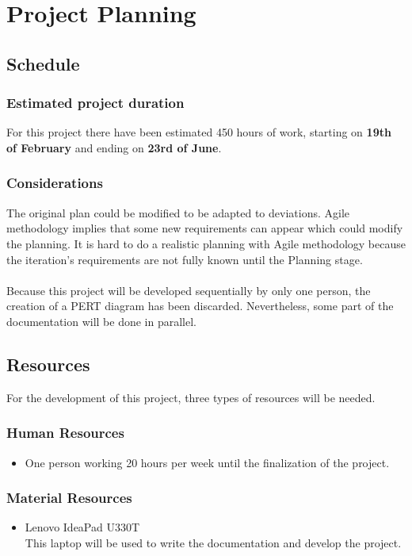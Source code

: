 \chapter{Project Planning}
\label{Chapter4}

\section{Schedule}
\subsection{Estimated project duration}
For this project there have been estimated 450 hours of work, starting on \textbf{19th of February} and ending on \textbf{23rd of June}.\\

\subsection{Considerations}
The original plan could be modified to be adapted to deviations. Agile methodology implies that some new requirements can appear which could modify the planning. It is hard to do a realistic planning with Agile methodology because the iteration's requirements are not fully known until the Planning stage.\\\\
Because this project will be developed sequentially by only one person, the creation of a PERT diagram has been discarded. Nevertheless, some part of the documentation will be done in parallel.

\section{Resources}
For the development of this project, three types of resources will be needed.
\subsection{Human Resources}
\begin{itemize}
	\item One person working 20 hours per week until the finalization of the project.
\end{itemize}
\subsection{Material Resources}
\begin{itemize}
	\item Lenovo IdeaPad U330T\\
	This laptop will be used to write the documentation and develop the project.
\end{itemize}
